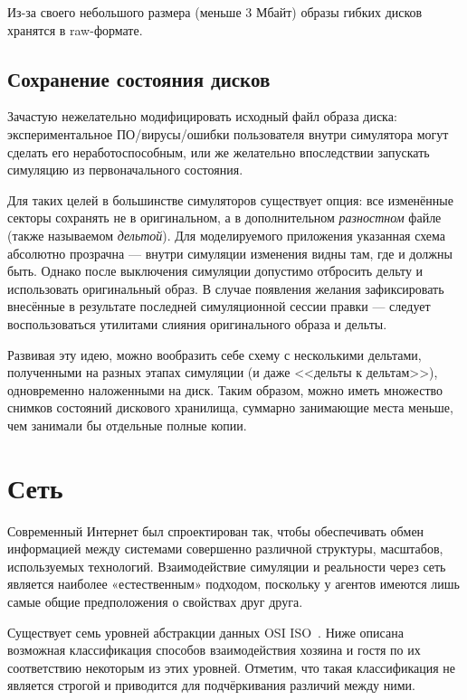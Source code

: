 Из-за своего небольшого размера (меньше 3 Мбайт) образы гибких дисков хранятся в raw-формате.

\subsection{Сохранение состояния дисков}

Зачастую нежелательно модифицировать исходный файл образа диска: экспериментальное ПО/вирусы/ошибки пользователя внутри симулятора могут сделать его неработоспособным, или же желательно впоследствии запускать симуляцию из первоначального состояния.

Для таких целей в большинстве симуляторов существует опция: все изменённые секторы сохранять не в оригинальном, а в дополнительном \textit{разностном} файле (также называемом \textit{дельтой}). Для моделируемого приложения указанная схема абсолютно прозрачна --- внутри симуляции изменения видны там, где и должны быть. Однако после выключения симуляции допустимо отбросить дельту и использовать оригинальный образ. В случае появления желания зафиксировать внесённые в результате последней симуляционной сессии правки --- следует воспользоваться утилитами слияния оригинального образа и дельты.

Развивая эту идею, можно вообразить себе схему с несколькими дельтами, полученными на разных этапах симуляции (и даже <<дельты к дельтам>>), одновременно наложенными на диск. Таким образом, можно иметь множество снимков состояний дискового хранилища, суммарно занимающие места меньше, чем занимали бы отдельные полные копии.

\section{Сеть}

Современный Интернет был спроектирован так, чтобы обеспечивать обмен информацией между системами совершенно различной структуры, масштабов, используемых технологий. Взаимодействие симуляции и реальности через сеть является наиболее «естественным» подходом, поскольку у агентов имеются лишь самые общие предположения о свойствах друг друга.

Существует семь уровней абстракции данных OSI ISO~\cite{osi-iso-rus}. Ниже описана возможная классификация способов взаимодействия хозяина и гостя по их соответствию некоторым из этих уровней. Отметим, что такая классификация не является строгой и приводится для подчёркивания различий между ними.


